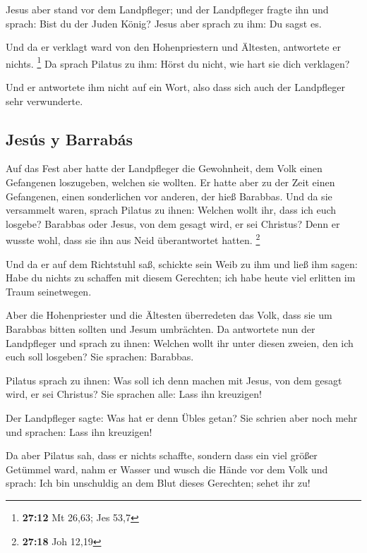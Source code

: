  Jesus aber stand vor dem Landpfleger; und der
Landpfleger fragte ihn und sprach: Bist du der Juden König? Jesus aber
sprach zu ihm: Du sagst es.

 Und da er verklagt ward von den Hohenpriestern und
Ältesten, antwortete er nichts. \footnote{\textbf{27:12} Mt 26,63; Jes
  53,7}  Da sprach Pilatus zu ihm: Hörst du nicht, wie
hart sie dich verklagen?

 Und er antwortete ihm nicht auf ein Wort, also dass sich
auch der Landpfleger sehr verwunderte.

\hypertarget{jesuxfas-y-barrabuxe1s}{%
\subsection{Jesús y Barrabás}\label{jesuxfas-y-barrabuxe1s}}

 Auf das Fest aber hatte der Landpfleger die Gewohnheit,
dem Volk einen Gefangenen loszugeben, welchen sie wollten.
 Er hatte aber zu der Zeit einen Gefangenen, einen
sonderlichen vor anderen, der hieß Barabbas.  Und da sie
versammelt waren, sprach Pilatus zu ihnen: Welchen wollt ihr, dass ich
euch losgebe? Barabbas oder Jesus, von dem gesagt wird, er sei Christus?
 Denn er wusste wohl, dass sie ihn aus Neid überantwortet
hatten. \footnote{\textbf{27:18} Joh 12,19}

 Und da er auf dem Richtstuhl saß, schickte sein Weib zu
ihm und ließ ihm sagen: Habe du nichts zu schaffen mit diesem Gerechten;
ich habe heute viel erlitten im Traum seinetwegen.

 Aber die Hohenpriester und die Ältesten überredeten das
Volk, dass sie um Barabbas bitten sollten und Jesum umbrächten.
 Da antwortete nun der Landpfleger und sprach zu ihnen:
Welchen wollt ihr unter diesen zweien, den ich euch soll losgeben? Sie
sprachen: Barabbas.

 Pilatus sprach zu ihnen: Was soll ich denn machen mit
Jesus, von dem gesagt wird, er sei Christus? Sie sprachen alle: Lass ihn
kreuzigen!

 Der Landpfleger sagte: Was hat er denn Übles getan? Sie
schrien aber noch mehr und sprachen: Lass ihn kreuzigen!

 Da aber Pilatus sah, dass er nichts schaffte, sondern
dass ein viel größer Getümmel ward, nahm er Wasser und wusch die Hände
vor dem Volk und sprach: Ich bin unschuldig an dem Blut dieses
Gerechten; sehet ihr zu!

